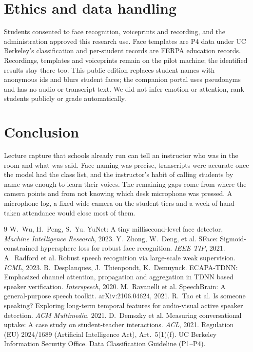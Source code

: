 \documentclass[10pt,twocolumn,letterpaper]{article}
\begin{document}
\section{Ethics and data handling}
Students consented to face recognition, voiceprints and recording, and the administration approved this research use. Face templates are P4 data under UC Berkeley's classification and per-student records are FERPA education records. Recordings, templates and voiceprints remain on the pilot machine; the identified results stay there too. This public edition replaces student names with anonymous ids and blurs student faces; the companion portal uses pseudonyms and has no audio or transcript text. We did not infer emotion or attention, rank students publicly or grade automatically.

\section{Conclusion}
Lecture capture that schools already run can tell an instructor who was in the room and what was said. Face naming was precise, transcripts were accurate once the model had the class list, and the instructor's habit of calling students by name was enough to learn their voices. The remaining gaps come from where the camera points and from not knowing which desk microphone was pressed. A microphone log, a fixed wide camera on the student tiers and a week of hand-taken attendance would close most of them.

{\small
\begin{thebibliography}{9}\setlength{\itemsep}{1pt}
 W.~Wu, H.~Peng, S.~Yu. YuNet: A tiny millisecond-level face detector. \emph{Machine Intelligence Research}, 2023.
 Y.~Zhong, W.~Deng, et al. SFace: Sigmoid-constrained hypersphere loss for robust face recognition. \emph{IEEE TIP}, 2021.
 A.~Radford et al. Robust speech recognition via large-scale weak supervision. \emph{ICML}, 2023.
 B.~Desplanques, J.~Thienpondt, K.~Demuynck. ECAPA-TDNN: Emphasized channel attention, propagation and aggregation in TDNN based speaker verification. \emph{Interspeech}, 2020.
 M.~Ravanelli et al. SpeechBrain: A general-purpose speech toolkit. arXiv:2106.04624, 2021.
 R.~Tao et al. Is someone speaking? Exploring long-term temporal features for audio-visual active speaker detection. \emph{ACM Multimedia}, 2021.
 D.~Demszky et al. Measuring conversational uptake: A case study on student-teacher interactions. \emph{ACL}, 2021.
 Regulation (EU) 2024/1689 (Artificial Intelligence Act), Art.~5(1)(f).
 UC Berkeley Information Security Office. Data Classification Guideline (P1--P4).
\end{thebibliography}}
\end{document}
